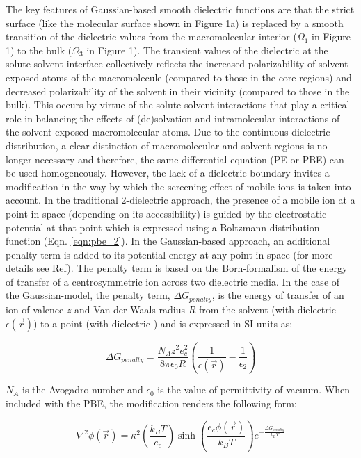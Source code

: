 \documentclass[9pt,tutorial]{livecoms}
\begin{document}
The key features of Gaussian-based smooth dielectric functions are that the strict surface (like the molecular surface shown in Figure 1a) is replaced by a smooth transition of the dielectric values from the macromolecular interior ($ \Omega_1 $ in Figure 1) to the bulk ($ \Omega_3 $ in Figure 1). The transient values of the dielectric at the solute-solvent interface collectively reflects the increased polarizability of solvent exposed atoms of the macromolecule (compared to those in the core regions) and decreased polarizability of the solvent in their vicinity (compared to those in the bulk). This occurs by virtue of the solute-solvent interactions that play a critical role in balancing the effects of (de)solvation and intramolecular interactions of the solvent exposed macromolecular atoms. 
Due to the continuous dielectric distribution, a clear distinction of macromolecular and solvent regions is no longer necessary and therefore, the same differential equation (PE or PBE) can be used homogeneously. However, the lack of a dielectric boundary invites a modification in the way by which the screening effect of mobile ions is taken into account. In the traditional 2-dielectric approach, the presence of a mobile ion at a point in space (depending on its accessibility) is guided by the electrostatic potential at that point which is expressed using a Boltzmann distribution function (Eqn. \ref{eqn:pbe_2}). In the Gaussian-based approach, an additional penalty term is added to its potential energy at any point in space (for more details see Ref\cite{jia2017treating}). The penalty term is based on the Born-formalism of the energy of transfer of a centrosymmetric ion across two dielectric media. In the case of the Gaussian-model, the penalty term, $ \Delta G_{penalty} $, is the energy of transfer of an ion of valence $ z $ and Van der Waals radius $ R $ from the solvent (with dielectric $ \epsilon(\Vec{r})$) to a point  (with dielectric ) and is expressed in SI units as:

\begin{equation}
\Delta G_{penalty} = \frac{N_Az^2e_c^2}{8\pi\epsilon_0 R} \left( \frac{1}{\epsilon(\Vec{r})} - \frac{1}{\epsilon_2} \right)
\end{equation}

$ N_A $ is the Avogadro number and $ \epsilon_0 $ is the value of permittivity of vacuum. When included with the PBE, the modification renders the following form:

\begin{equation}
\nabla^2\phi(\Vec{r}) = \kappa^2 \left (\frac{k_BT}{e_c} \right) \sinh\left({\frac{e_c\phi(\Vec{r})}{k_BT}} \right) e^{-\frac{\Delta G_{penalty}}{k_B T}}
\end{equation}
\end{document}
